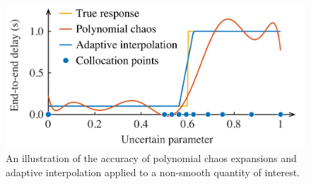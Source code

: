 \begin{figure}
  \centering
  \includegraphics[width=1.0\columnwidth]{include/assets/figures/motivation.pdf}
  \caption{
    An illustration of the accuracy of polynomial chaos expansions and adaptive
    interpolation applied to a non-smooth quantity of interest.
  }
 \end{figure}
